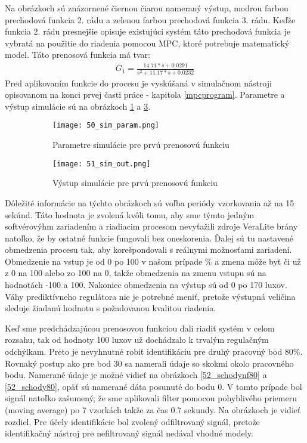 Na obrázkoch sú znázornené čiernou čiarou nameraný výstup, modrou farbou prechodová funkcia 2. rádu a zelenou farbou prechodová funkcia 3. rádu. Keďže funkcia 2. rádu presnejšie opisuje existujúci systém táto prechodová funkcia je vybratá na použitie do riadenia pomocou MPC, ktoré potrebuje matematický model. Táto prenosová funkcia má tvar:
\begin{equation} \label{eq40}
\begin{split}
 G_1 = \frac{14.71*s + 0.0291}{s^2 + 11.17*s + 0.0232}
\end{split}
\end{equation} 
Pred aplikovaním funkcie do procesu je  vyskúšaná v simulačnom nástroji opisovanom na konci prvej časti práce - kapitola \ref{mpcprogram}. Parametre a výstup simulácie sú na obrázkoch \ref{50_sim_param} a \ref{51_sim_out}.
\begin{figure}[!htbp]
\centering
\begin{subfigure}{0.5\linewidth}
\texttt{[image: 50\_sim\_param.png]}
\caption{Parametre simulácie pre prvú prenosovú funkciu}
\label{50_sim_param}
\end{subfigure}%
\begin{subfigure}{0.5\linewidth}
\texttt{[image: 51\_sim\_out.png]}
\caption{Výstup simulácie pre prvú prenosovú funkciu}
\label{51_sim_out}
\end{subfigure}
\caption{}
\end{figure}
Dôležité informácie na týchto obrázkoch sú voľba periódy vzorkovania až na 15 sekúnd. Táto hodnota je zvolená kvôli tomu, aby sme týmto jedným softvérovýhm zariadením a riadiacim procesom nevyťažili  zdroje VeraLite brány natoľko, že by ostatné funkcie fungovali bez oneskorenia.  Ďalej sú tu nastavené obmedzenia procesu tak, aby korešpondovali s reálnymi možnosťami zariadení. Obmedzenie na vstup je od 0 po 100 v našom prípade \% a zmena môže byť či už z 0 na 100 alebo zo 100 na 0, takže obmedzenia na zmenu vstupu sú na hodnotách -100 a 100. Nakoniec obmedzenia na výstup sú od 0 po 170 luxov. Váhy prediktívneho regulátora nie je potrebné meniť, pretože výstupná veličina sleduje žiadanú hodnotu s požadovanou kvalitou riadenia.
 
\indent Keď sme predchádzajúcou prenosovou funkciou dali riadiť systém v celom rozsahu, tak od hodnoty 100 luxov už dochádzalo k trvalým regulačným odchýlkam. Preto je nevyhnutné robiť identifikáciu pre druhý pracovný bod 80\%. Rovnaký postup ako pre bod 30 sa namerali údaje so skokmi okolo pracovného bodu. Namerané údaje je možné vidieť na obrázkoch \ref{52_schodynf80} a \ref{52_schody80}, opäť sú namerané dáta posunuté do bodu 0. V tomto prípade bol signál natoľko zašumený, že sme aplikovali filter pomocou pohyblivého priemeru (moving average) po 7 vzorkách takže za čas 0.7 sekundy. Na obrázkoch je vidieť rozdiel. Pre účely identifikácie bol zvolený odfiltrovaný signál, pretože identifikačný nástroj pre nefiltrovaný signál nedával vhodné modely. 

